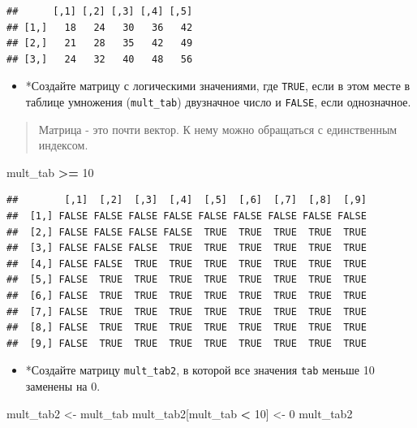 \documentclass[]{book}
\newenvironment{Shaded}{\begin{snugshade}}{\end{snugshade}}
\newcommand{\DecValTok}[1]{\textcolor[rgb]{0.00,0.00,0.81}{#1}}
\newcommand{\StringTok}[1]{\textcolor[rgb]{0.31,0.60,0.02}{#1}}
\newcommand{\OperatorTok}[1]{\textcolor[rgb]{0.81,0.36,0.00}{\textbf{#1}}}
\newcommand{\NormalTok}[1]{#1}
\providecommand{\tightlist}{%
  \setlength{\itemsep}{0pt}\setlength{\parskip}{0pt}}
\begin{document}
\begin{verbatim}
##      [,1] [,2] [,3] [,4] [,5]
## [1,]   18   24   30   36   42
## [2,]   21   28   35   42   49
## [3,]   24   32   40   48   56
\end{verbatim}

\begin{itemize}
\tightlist
\item
  *Создайте матрицу с логическими значениями, где \texttt{TRUE}, если в
  этом месте в таблице умножения (\texttt{mult\_tab}) двузначное число и
  \texttt{FALSE}, если однозначное.
\end{itemize}

\begin{quote}
Матрица - это почти вектор. К нему можно обращаться с единственным
индексом.
\end{quote}

\begin{Shaded}
\begin{Highlighting}[]
\NormalTok{mult_tab }\OperatorTok{>=}\StringTok{ }\DecValTok{10}
\end{Highlighting}
\end{Shaded}

\begin{verbatim}
##        [,1]  [,2]  [,3]  [,4]  [,5]  [,6]  [,7]  [,8]  [,9]
##  [1,] FALSE FALSE FALSE FALSE FALSE FALSE FALSE FALSE FALSE
##  [2,] FALSE FALSE FALSE FALSE  TRUE  TRUE  TRUE  TRUE  TRUE
##  [3,] FALSE FALSE FALSE  TRUE  TRUE  TRUE  TRUE  TRUE  TRUE
##  [4,] FALSE FALSE  TRUE  TRUE  TRUE  TRUE  TRUE  TRUE  TRUE
##  [5,] FALSE  TRUE  TRUE  TRUE  TRUE  TRUE  TRUE  TRUE  TRUE
##  [6,] FALSE  TRUE  TRUE  TRUE  TRUE  TRUE  TRUE  TRUE  TRUE
##  [7,] FALSE  TRUE  TRUE  TRUE  TRUE  TRUE  TRUE  TRUE  TRUE
##  [8,] FALSE  TRUE  TRUE  TRUE  TRUE  TRUE  TRUE  TRUE  TRUE
##  [9,] FALSE  TRUE  TRUE  TRUE  TRUE  TRUE  TRUE  TRUE  TRUE
\end{verbatim}

\begin{itemize}
\tightlist
\item
  *Создайте матрицу \texttt{mult\_tab2}, в которой все значения
  \texttt{tab} меньше 10 заменены на 0.
\end{itemize}

\begin{Shaded}
\begin{Highlighting}[]
\NormalTok{mult_tab2 <-}\StringTok{ }\NormalTok{mult_tab}
\NormalTok{mult_tab2[mult_tab }\OperatorTok{<}\StringTok{ }\DecValTok{10}\NormalTok{] <-}\StringTok{ }\DecValTok{0}
\NormalTok{mult_tab2}
\end{Highlighting}
\end{Shaded}
\end{document}
